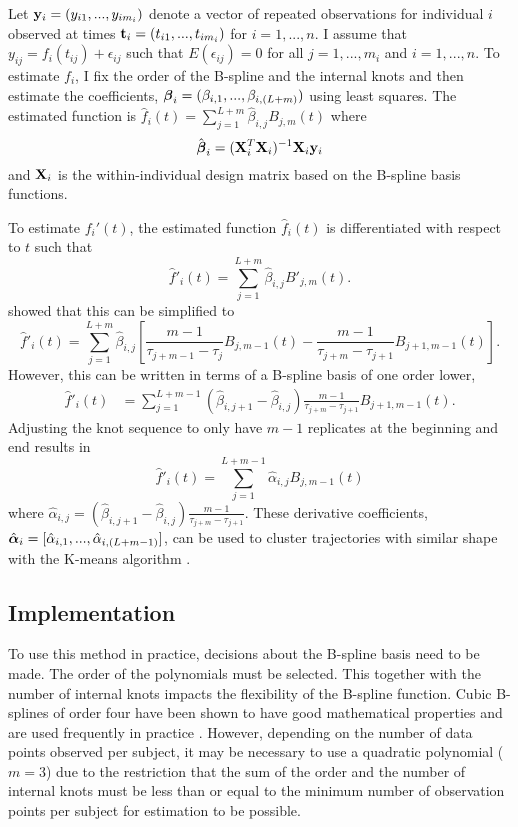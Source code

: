 Let $\mathbf y_{i}=(y_{i1},...,y_{im_{i}})$ denote a vector of repeated observations for individual $i$ observed at times $\mathbf t_{i}=(t_{i1},...,t_{im_{i}})$  for $i=1,...,n$. I assume that $y_{ij} = f_{i}(t_{ij}) + \epsilon_{ij}$ such that $E(\epsilon_{ij}) = 0$ for all $j=1,...,m_{i}$ and $i=1,...,n$.  To estimate $f_{i}$, I fix the order of the B-spline and the internal knots and then estimate the coefficients, $\boldsymbol \beta_{i} = (\beta_{i,1},...,\beta_{i, (L+m)})$ using least squares. The estimated function is $\hat{f}_i(t)=\sum^{L+m}_{j=1} \hat{\beta}_{i,j} B_{j,m}(t)$ where
$$\hat{\boldsymbol \beta}_{i} = (\mathbf X_{i}^{T}\mathbf X_{i})^{-1}\mathbf X_{i}\mathbf y_{i}$$
and $\mathbf X_{i}$ is the within-individual design matrix based on the B-spline basis functions. 

To estimate $f_i'(t)$, the estimated function $\hat{f}_i(t)$ is differentiated with respect to $t$ such that
$$\hat{f}'_i(t)=\sum^{L+m}_{j=1} \hat{\beta}_{i,j} B'_{j,m}(t).$$
\Textcite{prochazkova2005} showed that this can be simplified to
$$\hat{f}'_i(t)=\sum^{L+m}_{j=1} \hat{\beta}_{i,j} \left[\frac{m-1}{\tau_{j+m-1}-\tau_j} B_{j,m-1}(t)-\frac{m-1}{\tau_{j+m}-\tau_{j+1}} B_{j+1,m-1}(t)\right].$$
However, this can be written in terms of a B-spline basis of one order lower,
\begin{align*}
\hat{f}'_i(t)&=\sum^{L+m-1}_{j=1} (\hat{\beta}_{i,j+1} -\hat{\beta}_{i,j})\frac{m-1}{\tau_{j+m}-\tau_{j+1} }B_{j+1,m-1}(t).
\end{align*}
Adjusting the knot sequence to only have $m-1$ replicates at the beginning and end results in
$$\hat{f}'_i(t)=\sum^{L+m-1}_{j=1}\hat{\alpha}_{i,j}B_{j,m-1}(t)$$
where $\hat{\alpha}_{i,j}= (\hat{\beta}_{i,j+1} -\hat{\beta}_{i,j})\frac{m-1}{\tau_{j+m}-\tau_{j+1} }$.
These derivative coefficients, $\hat{\boldsymbol \alpha}_{i} = [\hat{\alpha}_{i,1},...,\hat{\alpha}_{i,(L+m-1)}]$, can be used to cluster trajectories with similar shape with the K-means algorithm \cite{macqueen1967, hartigan1979}. 

\subsection{Implementation}
To use this method in practice, decisions about the B-spline basis need to be made. The order of the polynomials must be selected. This together with the number of internal knots impacts the flexibility of the B-spline function. Cubic B-splines of order four have been shown to have good mathematical properties and are used frequently in practice \cite{james2003}. However, depending on the number of data points observed per subject, it may be necessary to use a quadratic polynomial ($m = 3$) due to the restriction that the sum of the order and the number of internal knots must be less than or equal to the minimum number of observation points per subject for estimation to be possible. 

